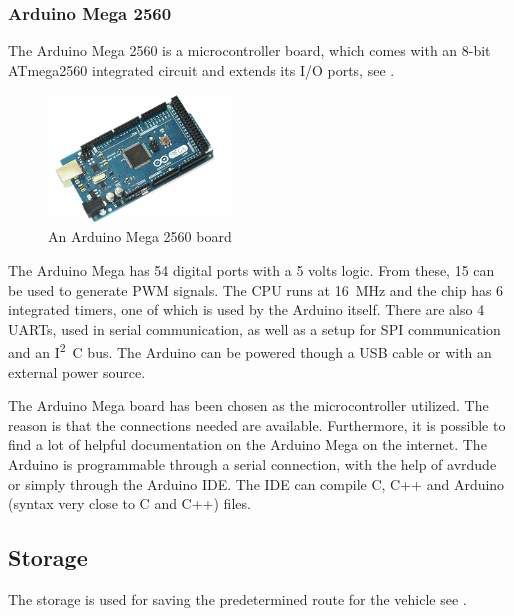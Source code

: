 \subsubsection{Arduino Mega 2560}
The Arduino Mega 2560 is a microcontroller board, which comes with an 8-bit ATmega2560 integrated circuit and extends its I/O ports, see  \cite{MegaInfo}. 
\begin{figure}[H]
	\centering
\includegraphics[width=0.45\textwidth]{figures/ArduinoMega.png}
		\caption{An Arduino Mega 2560 board \cite{MegaInfo}} 
	\label{ArduinoMega}
\end{figure}\vspace{-5mm}
%
The Arduino Mega has \si{54} digital ports with a 5 volts logic. From these, \si{15} can be used to generate PWM signals. The CPU runs at \si{16 MHz} and the chip has \si{6} integrated timers, one of which is used by the Arduino itself. There are also 4 UARTs, used in serial communication, as well as a setup for SPI communication and an \si{I^2C} bus. The Arduino can be powered though a USB cable or with an external power source.

The Arduino Mega board has been chosen as the microcontroller utilized. The reason is that the connections needed are available. Furthermore, it is possible to find a lot of helpful documentation on the Arduino Mega on the internet. The Arduino is programmable through a serial connection, with the help of avrdude\cite{Avrdude} or simply through the Arduino IDE\cite{ArduinoIDE}. The IDE can compile C, C++ and Arduino (syntax very close to C and C++) files.


\subsection{Storage}
The storage is used for saving the predetermined route for the vehicle see .

